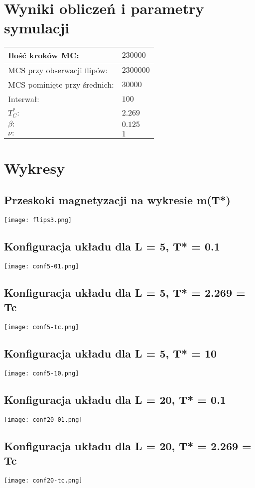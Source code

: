 \documentclass{article}
\begin{document}
\newpage
\section{Wyniki obliczeń i parametry symulacji}
\begin{center}
\begin{tabular}{p{5cm}|p{5cm}}
	Ilość kroków MC: & $230 000$\\
	\hline
	MCS przy obserwacji flipów: & $2 300 000$\\
	\hline
	MCS pominięte przy średnich: & $30 000$\\
	\hline
	Interwał: & $100$\\
	\hline
	$T^*_C:$ & $2.269$\\
	\hline
	$\beta:$ & $0.125$\\
	\hline
	$\nu:$ & $1$\\
\end{tabular}
\end{center}

\section{Wykresy}
\subsection{Przeskoki magnetyzacji na wykresie m(T*)}
\texttt{[image: flips3.png]}

\subsection{Konfiguracja układu dla L = 5, T* = 0.1}
\texttt{[image: conf5-01.png]}
\subsection{Konfiguracja układu dla L = 5, T* = 2.269 = Tc}
\texttt{[image: conf5-tc.png]}
\subsection{Konfiguracja układu dla L = 5, T* = 10}
\texttt{[image: conf5-10.png]}

\subsection{Konfiguracja układu dla L = 20, T* = 0.1}
\texttt{[image: conf20-01.png]}
\subsection{Konfiguracja układu dla L = 20, T* = 2.269 = Tc}
\texttt{[image: conf20-tc.png]}
\end{document}
